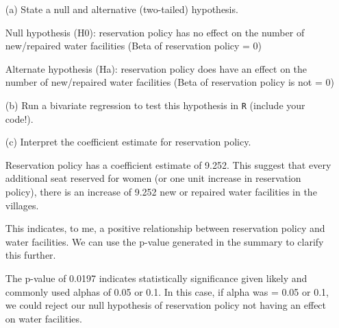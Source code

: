 \documentclass[12pt,letterpaper]{article}
\begin{document}
\newpage
\begin{enumerate}
	\item [(a)] State a null and alternative (two-tailed) hypothesis. 
	\vspace{0.5cm}
	
	Null hypothesis (H0): reservation policy has no effect on the number of new/repaired water facilities (Beta of reservation policy = 0)
	
	Alternate hypothesis (Ha): reservation policy does have an effect on the number of new/repaired water facilities (Beta of reservation policy is not = 0)
	
	\vspace{0.5cm}
	\item [(b)] Run a bivariate regression to test this hypothesis in \texttt{R} (include your code!).
	\vspace{0.5cm}
	
	
	
	\vspace{0.5cm}
	\item [(c)] Interpret the coefficient estimate for reservation policy. 
	
		
		
	Reservation policy has a coefficient estimate of 9.252. This suggest that every additional seat reserved for women (or one unit increase in reservation policy), there is an increase of 9.252 new or repaired water facilities in the villages.
	
	This indicates, to me, a positive relationship between reservation policy and water facilities. We can use the p-value generated in the summary to clarify this further.
	
	The p-value of 0.0197 indicates statistically significance given likely and commonly used alphas of 0.05 or 0.1. In this case, if alpha was = 0.05 or 0.1, we could reject our null hypothesis of reservation policy not having an effect on water facilities.
	
		
		
\end{enumerate}
\end{document}

